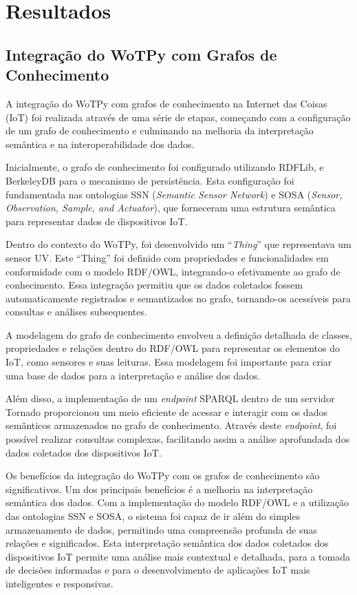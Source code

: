 \chapter{Resultados}

\section{Integração do WoTPy com Grafos de Conhecimento}

A integração do WoTPy com grafos de conhecimento na Internet das Coisas (IoT) foi realizada através de uma série de etapas, começando com a configuração de um grafo de conhecimento e culminando na melhoria da interpretação semântica e na interoperabilidade dos dados.

Inicialmente, o grafo de conhecimento foi configurado utilizando RDFLib, e BerkeleyDB para o mecanismo de persistência. Esta configuração foi fundamentada nas ontologias SSN (\textit{Semantic Sensor Network}) e SOSA (\textit{Sensor, Observation, Sample, and Actuator}), que forneceram uma estrutura semântica para representar dados de dispositivos IoT.

Dentro do contexto do WoTPy, foi desenvolvido um ``\textit{Thing}'' que representava um sensor UV. Este ``Thing'' foi definido com propriedades e funcionalidades em conformidade com o modelo RDF/OWL, integrando-o efetivamente ao grafo de conhecimento. Essa integração permitiu que os dados coletados fossem automaticamente registrados e semantizados no grafo, tornando-os acessíveis para consultas e análises subsequentes.

A modelagem do grafo de conhecimento envolveu a definição detalhada de classes, propriedades e relações dentro do RDF/OWL para representar os elementos do IoT, como sensores e suas leituras. Essa modelagem foi importante para criar uma base de dados para a interpretação e análise dos dados.

Além disso, a implementação de um \textit{endpoint} SPARQL dentro de um servidor Tornado proporcionou um meio eficiente de acessar e interagir com os dados semânticos armazenados no grafo de conhecimento. Através deste \textit{endpoint}, foi possível realizar consultas complexas, facilitando assim a análise aprofundada dos dados coletados dos dispositivos IoT.

Os benefícios da integração do WoTPy com os grafos de conhecimento são significativos. Um dos principais benefícios é a melhoria na interpretação semântica dos dados. Com a implementação do modelo RDF/OWL e a utilização das ontologias SSN e SOSA, o sistema foi capaz de ir além do simples armazenamento de dados, permitindo uma compreensão profunda de suas relações e significados. Esta interpretação semântica dos dados coletados dos dispositivos IoT permite uma análise mais contextual e detalhada, para a tomada de decisões informadas e para o desenvolvimento de aplicações IoT mais inteligentes e responsivas.

